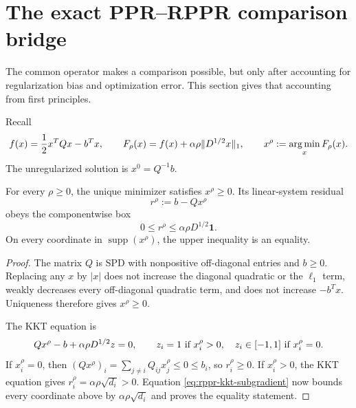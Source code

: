 \section{The exact PPR--RPPR comparison bridge}
\label{sec:comparison-bridge}

The common operator makes a comparison possible, but only after accounting
for regularization bias and optimization error.  This section gives that
accounting from first principles.

Recall
\begin{equation}
 f(x)=\frac12x^TQx-b^Tx,
 \qquad
 F_\rho(x)=f(x)+\alpha\rho\|D^{1/2}x\|_1,
 \qquad
 x^\rho:=\operatorname*{arg\,min}_x F_\rho(x).
 \label{eq:ppr-rppr-objectives}
\end{equation}
The unregularized solution is $x^0=Q^{-1}b$.

\begin{lemma}
\label{lem:rppr-residual-box}
For every $\rho\geq0$, the unique minimizer satisfies $x^\rho\geq0$.  Its
linear-system residual
\begin{equation}
 r^\rho:=b-Qx^\rho
 \label{eq:rppr-linear-residual}
\end{equation}
obeys the componentwise box
\begin{equation}
 0\leq r^\rho\leq\alpha\rho D^{1/2}\mathbf1.
 \label{eq:rppr-residual-box}
\end{equation}
On every coordinate in $\operatorname{supp}(x^\rho)$, the upper inequality
is an equality.
\end{lemma}

\begin{proof}
The matrix $Q$ is SPD with nonpositive off-diagonal entries and $b\geq0$.
Replacing any $x$ by $|x|$ does not increase the diagonal quadratic or the
$\ell_1$ term, weakly decreases every off-diagonal quadratic term, and does
not increase $-b^Tx$.  Uniqueness therefore gives $x^\rho\geq0$.

The KKT equation is
\begin{equation}
 Qx^\rho-b+\alpha\rho D^{1/2}z=0,
 \qquad
 z_i=1\ \hbox{if }x_i^\rho>0,
 \quad z_i\in[-1,1]\ \hbox{if }x_i^\rho=0.
 \label{eq:rppr-kkt-subgradient}
\end{equation}
If $x_i^\rho=0$, then
$(Qx^\rho)_i=\sum_{j\ne i}Q_{ij}x_j^\rho\leq0\leq b_i$, so
$r_i^\rho\geq0$.  If $x_i^\rho>0$, the KKT equation gives
$r_i^\rho=\alpha\rho\sqrt{d_i}>0$.  Equation
\eqref{eq:rppr-kkt-subgradient} now bounds every coordinate above by
$\alpha\rho\sqrt{d_i}$ and proves the equality statement.
\end{proof}

